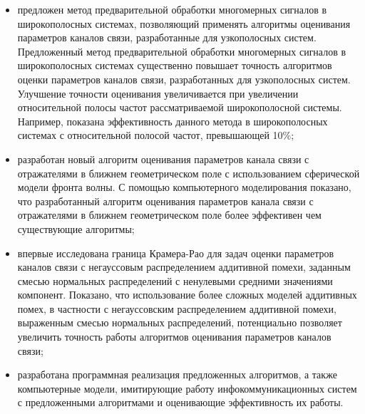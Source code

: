 
\begin{itemize}
\item предложен метод предварительной обработки многомерных сигналов в широкополосных системах, позволяющий применять алгоритмы оценивания параметров каналов связи, разработанные для узкополосных систем. Предложенный метод предварительной обработки многомерных сигналов в широкополосных системах существенно повышает точность алгоритмов оценки параметров каналов связи, разработанных для узкополосных систем. Улучшение точности оценивания увеличивается при увеличении относительной полосы частот рассматриваемой широкополосной системы. Например, показана эффективность данного метода в широкополосных системах с относительной полосой частот, превышающей 10\%; 
\item разработан новый алгоритм оценивания параметров канала связи с отражателями в ближнем геометрическом поле с использованием сферической модели фронта волны. С помощью компьютерного моделирования показано, что разработанный алгоритм оценивания параметров канала связи с отражателями в ближнем геометрическом поле более эффективен чем существующие алгоритмы;
\item впервые исследована граница Крамера-Рао для задач оценки параметров каналов связи с негауссовым распределением аддитивной помехи, заданным смесью нормальных распределений с ненулевыми средними значениями компонент. Показано, что использование более сложных моделей аддитивных помех, в частности с негауссовским распределением аддитивной помехи, выраженным смесью нормальных распределений, потенциально позволяет увеличить точность работы алгоритмов оценивания параметров каналов связи;
\item разработана программная реализация предложенных алгоритмов, а также компьютерные модели, имитирующие работу инфокоммуникационных систем с предложенными алгоритмами и оценивающие эффективность их работы.
\end{itemize}

\begin{comment}
Результаты математического моделирования показали практическую применимость метода вычисления нижней границы Крамера-Рао. Используя данный метод граница может быть вычислена при произвольном распределении аддитивной помехи. Результаты моделирования также показали, что граница Крамера-Рао ниже для сложных распределений аддитивных помех. Следовательно, алгоритмы на основе сложных моделей аддитивных помех содержат потенциал к улучшению качества оценивания искомых параметров, и, как следствие, к улучшению качественных показателей функционирования систем радиолокации и телекоммуникаций.
\end{comment}